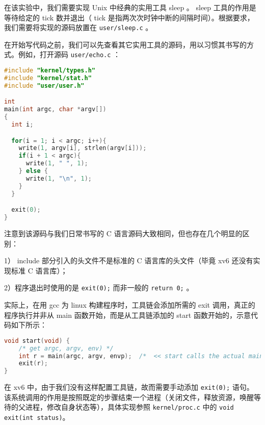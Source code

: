 在该实验中，我们需要实现 Unix 中经典的实用工具 sleep 。 sleep 工具的作用是等待给定的 tick 数并退出（ tick 是指两次次时钟中断的间隔时间）。根据要求，我们需要将实现的源码放置在 \lstinline{user/sleep.c} 。

在开始写代码之前，我们可以先查看其它实用工具的源码，用以习惯其书写的方式。例如，打开源码 \lstinline{user/echo.c} ：
\begin{lstlisting}[language=C]
#include "kernel/types.h"
#include "kernel/stat.h"
#include "user/user.h"

int
main(int argc, char *argv[])
{
  int i;

  for(i = 1; i < argc; i++){
    write(1, argv[i], strlen(argv[i]));
    if(i + 1 < argc){
      write(1, " ", 1);
    } else {
      write(1, "\n", 1);
    }
  }

  exit(0);
}
\end{lstlisting}

注意到该源码与我们日常书写的 C 语言源码大致相同，但也存在几个明显的区别：

1） include 部分引入的头文件不是标准的 C 语言库的头文件（毕竟 xv6 还没有实现标准 C 语言库）；

2）程序退出时使用的是 \lstinline{exit(0);} 而非一般的 \lstinline{return 0;} 。

\begin{proposition}
实际上，在用 gcc 为 linux 构建程序时，工具链会添加所需的 exit 调用，真正的程序执行并非从 main 函数开始，而是从工具链添加的 start 函数开始的，示意代码如下所示：
\begin{lstlisting}[language=C]
void start(void) {
    /* get argc, argv, env) */
    int r = main(argc, argv, envp);  /*  << start calls the actual main */
    exit(r);
}
\end{lstlisting}
在 xv6 中，由于我们没有这样配置工具链，故而需要手动添加 \lstinline{exit(0);} 语句。
该系统调用的作用是按照既定的步骤结束一个进程（关闭文件，释放资源，唤醒等待的父进程，修改自身状态等），具体实现参照 \lstinline{kernel/proc.c} 中的 \lstinline{void exit(int status)}。
\end{proposition}


